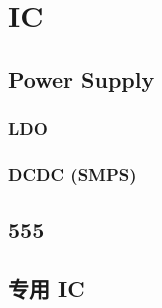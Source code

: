 \chapter{IC}

\section{Power Supply}
\subsection{LDO}
\subsection{DCDC (SMPS)}

\section{555}

\section{专用 IC}
